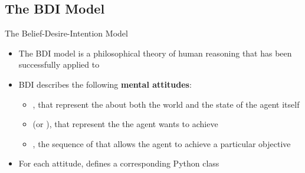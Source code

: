 \subsection{The BDI Model}
\begin{frame}[label=2]{The Belief-Desire-Intention Model}
  \begin{itemize}
    \item
      The BDI model is a philosophical theory of human reasoning 
      that has been successfully applied to  
\N
    \item 
      BDI describes the following \textbf{mental attitudes}:
      \begin{itemize}
      \n
        \item 
          , that represent the  
          about both the world and the state of the agent itself
      \n
        \item
           (or ), that represent the 
           the agent wants to achieve
      \n
        \item
          , the sequence of  that allows 
          the agent to achieve a particular objective
      \end{itemize} 
\N
    \item
      For each attitude,  defines a corresponding Python class
    \end{itemize}
\N\N
\end{frame}



